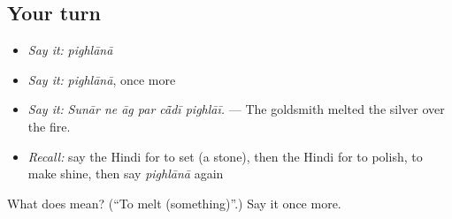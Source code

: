 \subsection*{Your turn}
\begin{itemize}
\raggedright
  \item \emph{Say it:} \emph{pighlānā}
  \item \emph{Say it:} \emph{pighlānā}, once more
  \item \emph{Say it:} \emph{Sunār ne āg par cā̃dī pighlāī.} — The goldsmith melted the silver over the fire.
  \item \emph{Recall:} say the Hindi for to set (a stone), then the Hindi for to polish, to make shine, then say \emph{pighlānā} again
\end{itemize}

\begin{tcolorbox}[breakable,colback=teal!4,colframe=teal!35!black,title={Before you move on}]
What does  mean? (\textquotedblleft{}To melt (something)\textquotedblright{}.) Say it once more.
\end{tcolorbox}
